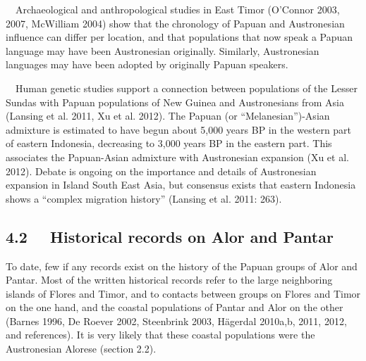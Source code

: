\ \ Archaeological and anthropological studies in East Timor (O{\textquoteright}Connor 2003, 2007, McWilliam 2004) show that the chronology of Papuan and Austronesian influence can differ per location, and that populations that now speak a Papuan language may have been Austronesian originally. Similarly, Austronesian languages may have been adopted by originally Papuan speakers.

\ \ Human genetic studies support a connection between populations of the Lesser Sundas with Papuan populations of New Guinea and Austronesians from Asia (Lansing et al. 2011, Xu et al. 2012). The Papuan (or {\textquotedblleft}Melanesian{\textquotedblright})-Asian admixture is estimated to have begun about 5,000 years BP in the western part of eastern Indonesia, decreasing to 3,000 years BP in the eastern part. This associates the Papuan-Asian admixture with Austronesian expansion (Xu et al. 2012). Debate is ongoing on the importance and details of Austronesian expansion in Island South East Asia, but consensus exists that eastern Indonesia shows a {\textquotedblleft}complex migration history{\textquotedblright} (Lansing et al. 2011: 263). 

\subsection[4.2 \ \ Historical records on Alor and Pantar]{4.2 \ \ Historical records on Alor and Pantar}
To date, few if any records exist on the history of the Papuan groups of Alor and Pantar. Most of the written historical records refer to the large neighboring islands of Flores and Timor, and to contacts between groups on Flores and Timor on the one hand, and the coastal populations of Pantar and Alor on the other (Barnes 1996, De Roever 2002, Steenbrink 2003, H\"agerdal 2010a,b, 2011, 2012, and references). It is very likely that these coastal populations were the Austronesian Alorese (section 2.2). 

